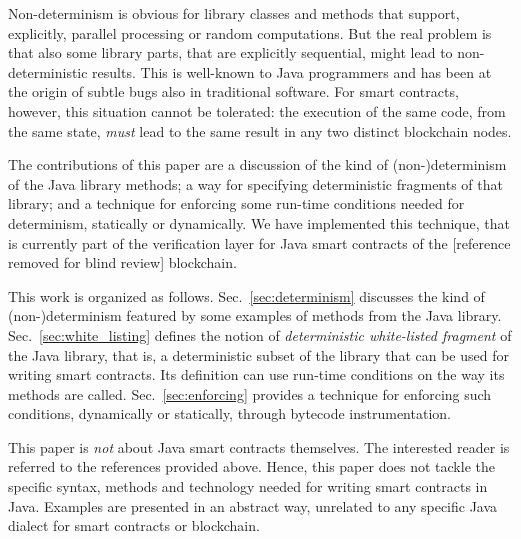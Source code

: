 Non-determinism is obvious for library classes and methods that support, explicitly,
parallel processing or random computations. But the real problem is that
also some library parts, that are explicitly sequential, might lead to
non-deterministic results.
This is well-known to Java programmers and has been at the origin of subtle
bugs also in traditional software. For smart contracts, however,
this situation cannot be tolerated: the execution of the same code, from the same state,
\emph{must} lead to the same result in any two distinct blockchain nodes.

The contributions of this paper are a discussion of the kind of (non-)determinism
of the Java library methods; a way for specifying deterministic fragments
of that library; and a technique for
enforcing some run-time conditions needed for determinism, statically or dynamically.
We have implemented this technique, that is currently part of the verification
layer for Java smart contracts of the [reference removed for blind review] blockchain.

This work is organized as follows.
Sec.~\ref{sec:determinism} discusses the kind of (non-)determinism featured by some
examples of methods from the Java library.
Sec.~\ref{sec:white_listing} defines the notion of \emph{deterministic white-listed fragment} of the Java library,
that is, a deterministic subset of the library that can be used for writing smart contracts.
Its definition can use run-time conditions on the way its methods are called.
Sec.~\ref{sec:enforcing} provides a technique for enforcing such conditions, dynamically
or statically, through bytecode instrumentation.

This paper is \emph{not} about Java smart contracts themselves. The interested reader
is referred to the references provided above. Hence, this paper does not tackle
the specific syntax, methods and technology needed for writing smart contracts in Java.
Examples are presented in an abstract way, unrelated to any specific
Java dialect for smart contracts or blockchain.
